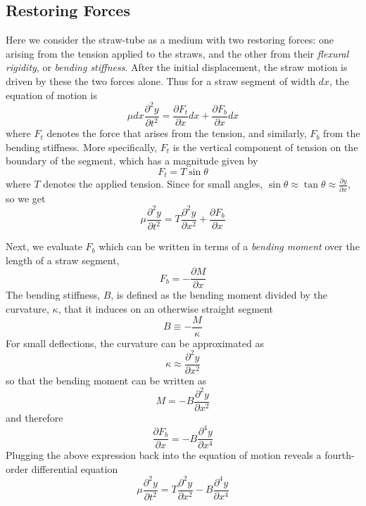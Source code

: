 \documentclass[twoside]{article}
\begin{document}
\begin{multicols}{2} %




\section{Restoring Forces}
Here we consider the straw-tube as a medium with two restoring forces: one arising from the tension applied to the straws, and the other from their \emph{flexural rigidity}, or \emph{bending stiffness}.  After the initial displacement, the straw motion is driven by these the two forces alone. Thus for a straw segment of width $dx$, the equation of motion is
\begin{equation}
\mu dx \frac{\partial^2y}{\partial t^2}  = \frac{\partial F_t}{\partial x}dx + \frac{\partial F_b}{\partial x}dx 
\end{equation}
where $F_t$ denotes the force that arises from the tension, and similarly, $F_b$ from the bending stiffness. More specifically, $F_t$ is the vertical component of tension on the boundary of the segment, which has a magnitude given by
\begin{equation}
F_t = T \sin\theta 
\end{equation}
where $T$ denotes the applied tension. Since for small angles, $\sin\theta \approx \tan\theta \approx \frac{\partial y}{\partial x}$, so we get
\begin{equation}
\mu \frac{\partial ^2y}{\partial t^2}  =  T\frac{\partial^2 y}{\partial x^2} + \frac{\partial F_b}{\partial x} 
\end{equation}


Next, we evaluate $F_b$ which can be written in terms of a \emph{bending moment} over the length of a straw segment,
\begin{equation}
F_b  = -\frac{\partial M}{\partial x} 
\end{equation}
The bending stiffness, $B$, is defined as the bending moment divided by the curvature, $\kappa$, that it induces on an otherwise straight segment
\begin{equation}
 B \equiv -\frac{M}{\kappa}
\end{equation}
For small deflections, the curvature can be approximated as
\begin{equation}
\kappa \approx \frac{\partial^2y}{\partial x^2}
\end{equation}
so that the bending moment can be written as
\begin{equation}
M = - B \frac{\partial^2y}{\partial x^2}
\end{equation}
and therefore
\begin{equation}
	\frac{\partial F_b}{\partial x} =  -B \frac{\partial^4y}{\partial x^4}
\end{equation}
Plugging the above expression back into the equation of motion reveals a fourth-order differential equation
\begin{equation}
\boxed{
\mu \frac{\partial^2y}{\partial t^2} = T \frac{\partial^2y}{\partial x^2} - B \frac{\partial^4y}{\partial x^4}
\label{eq:it}
}
\end{equation}



\end{multicols}
\end{document}
